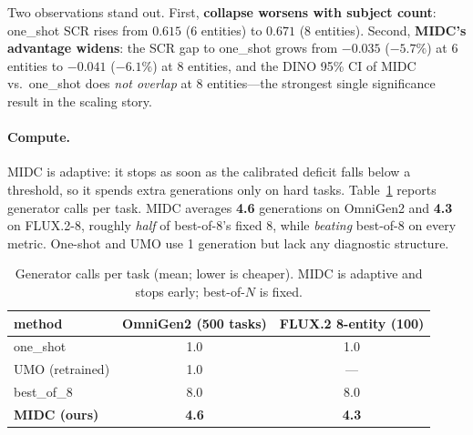 \documentclass[letterpaper]{article}
\begin{document}
Two observations stand out. First, \textbf{collapse worsens with subject count}: one\_shot SCR rises from $0.615$ (6 entities) to $0.671$ (8 entities). Second, \textbf{MIDC's advantage widens}: the SCR gap to one\_shot grows from $-0.035$ ($-5.7\%$) at 6 entities to $-0.041$ ($-6.1\%$) at 8 entities, and the DINO 95\% CI of MIDC vs.\ one\_shot does \emph{not overlap} at 8 entities---the strongest single significance result in the scaling story.

\paragraph{Compute.} MIDC is adaptive: it stops as soon as the calibrated deficit falls below a threshold, so it spends extra generations only on hard tasks. Table~\ref{tab:compute} reports generator calls per task. MIDC averages \textbf{4.6} generations on OmniGen2 and \textbf{4.3} on FLUX.2-8, roughly \emph{half} of best-of-8's fixed 8, while \emph{beating} best-of-8 on every metric. One-shot and UMO use 1 generation but lack any diagnostic structure.

\begin{table}[ht]
\centering
\small
\caption{Generator calls per task (mean; lower is cheaper). MIDC is adaptive and stops early; best-of-$N$ is fixed.}
\label{tab:compute}
\begin{tabular}{lcc}
\toprule
method & OmniGen2 (500 tasks) & FLUX.2 8-entity (100) \\
\midrule
one\_shot & 1.0 & 1.0 \\
UMO (retrained) & 1.0 & --- \\
best\_of\_8 & 8.0 & 8.0 \\
\textbf{MIDC (ours)} & \textbf{4.6} & \textbf{4.3} \\
\bottomrule
\end{tabular}
\end{table}
\end{document}

